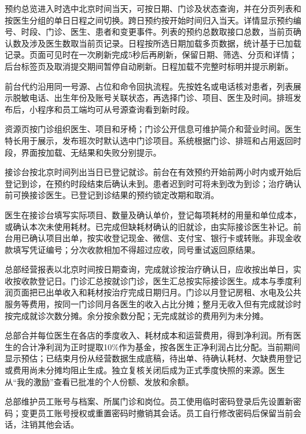 \documentclass[UTF8,12pt,a4paper,fontset=none]{ctexart}
\begin{document}
预约总览进入时选中北京时间当天，可按日期、门诊及状态查询，并在分页列表和按医生分组的单日日程之间切换。跨日预约按开始时间归入当天。详情显示预约编号、时段、门诊、医生、患者和变更事件。列表的预约总数取接口总数，当前页确认数及涉及医生数取当前页记录。日程按所选日期加载多页数据，统计基于已加载记录。页面可见时在一次刷新完成5秒后再刷新，保留日期、筛选、分页和详情；后台标签页及取消提交期间暂停自动刷新。日程加载不完整时标明并提示刷新。\par
前台代约沿用同一号源、占位和命令回执流程。先按姓名或电话核对患者，列表展示脱敏电话、出生年份及账号关联状态，再选择门诊、项目、医生及时间。排班发布后，小程序和员工端均可从号源查询看到新时段。\par
资源页按门诊组织医生、项目和牙椅；门诊公开信息可维护简介和营业时间。医生特长用于展示，发布班次时默认选中门诊项目。系统根据门诊、排班和占用返回时段，界面按加载、无结果和失败分别提示。\par
接诊台按北京时间列出当日已登记就诊。前台在有效预约开始前两小时内或开始后登记到诊，在预约时段结束后确认未到。患者迟到时可将未到改为到诊；治疗确认前可换接诊医生。已登记到诊结果的预约锁定改期和取消。\par
医生在接诊台填写实际项目、数量及确认单价，登记每项耗材的用量和单位成本，或确认本次未使用耗材。已完成但缺耗材确认的旧就诊，由实际接诊医生补记。前台用已确认项目出单，按实收登记现金、微信、支付宝、银行卡或转账。非现金收款填写凭证编号；分次收款相加不得超过应收，同号重试返回原结果。\par
总部经营报表以北京时间按日期查询，完成就诊按治疗确认日，应收按出单日，实收按收款登记日。门诊汇总按就诊门诊，医生汇总按实际接诊医生。成本与季度利润页面把已出单收入和耗材按治疗完成日期归月。门诊以月登记房租、水电及公共服务等费用，按同一门诊同月各医生的收入占比分摊；整月无收入但有完成就诊时按完成就诊次数分摊。余分按余数分配；无完成就诊的费用列为未分摊。\par
总部合并每位医生在各店的季度收入、耗材成本和运营费用，得到净利润。所有医生的合计净利润为正时提取10\%作为基金，按各医生正净利润占比分配。当前期间显示预估；已结束月份从经营数据生成底稿，待出单、待确认耗材、欠缺费用登记或费用尚未分摊均阻止生成。独立复核关闭后成为正式季度快照的来源。医生从“我的激励”查看已批准的个人份额、发放和余额。\par
总部维护员工账号与档案、所属门诊和岗位。员工使用临时密码登录后先设置新密码；变更员工账号授权或重置密码时撤销其会话。员工自行修改密码后保留当前会话，注销其他会话。\par
\Needspace{208pt}
\end{document}
